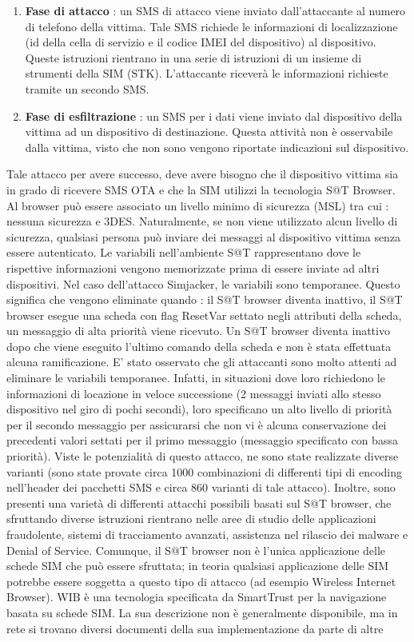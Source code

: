 \begin{enumerate}
\item \textbf{Fase di attacco} : un SMS di attacco viene inviato dall'attaccante al numero di telefono della vittima. Tale SMS richiede le informazioni di localizzazione (id della cella di servizio e il codice IMEI del dispositivo) al dispositivo. Queste istruzioni rientrano in una serie di istruzioni di un insieme di strumenti della SIM (STK). L'attaccante riceverà le informazioni richieste tramite un secondo SMS.
\item \textbf{Fase di esfiltrazione} : un SMS per i dati viene inviato dal dispositivo della vittima ad un dispositivo di destinazione. Questa attività non è osservabile dalla vittima, visto che non sono vengono riportate indicazioni sul dispositivo.
\end{enumerate}
Tale attacco per avere successo, deve avere bisogno che il dispositivo vittima sia in grado di ricevere SMS OTA e che la SIM utilizzi la tecnologia S@T Browser. Al browser può essere associato un livello minimo di sicurezza (MSL) tra cui : nessuna sicurezza e 3DES. Naturalmente, se non viene utilizzato alcun livello di sicurezza, qualsiasi persona può inviare dei messaggi al dispositivo vittima senza essere autenticato. Le variabili nell'ambiente S@T rappresentano dove le rispettive informazioni vengono memorizzate prima di essere inviate ad altri dispositivi. Nel caso dell'attacco Simjacker, le variabili sono temporanee. Questo significa che vengono eliminate quando : il S@T browser diventa inattivo, il S@T browser esegue una scheda con flag ResetVar settato negli attributi della scheda, un messaggio di alta priorità viene ricevuto. Un S@T browser diventa inattivo dopo che viene eseguito l'ultimo comando della scheda e non è stata effettuata alcuna ramificazione. E' stato osservato che gli attaccanti sono molto attenti ad eliminare le variabili temporanee. Infatti, in situazioni dove loro richiedono le informazioni di locazione in veloce successione (2 messaggi inviati allo stesso dispositivo nel giro di pochi secondi), loro specificano un alto livello di priorità per il secondo messaggio per assicurarsi che non vi è alcuna conservazione dei precedenti valori settati per il primo messaggio (messaggio specificato con bassa priorità). Viste le potenzialità di questo attacco, ne sono state realizzate diverse varianti (sono state provate circa 1000 combinazioni di differenti tipi di encoding nell'header dei pacchetti SMS e circa 860 varianti di tale attacco). Inoltre, sono presenti una varietà di differenti attacchi possibili basati sul S@T browser, che sfruttando diverse istruzioni rientrano nelle aree di studio delle applicazioni fraudolente, sistemi di tracciamento avanzati, assistenza nel rilascio dei malware e Denial of Service. Comunque, il S@T browser non è l'unica applicazione delle schede SIM che può essere sfruttata; in teoria qualsiasi applicazione delle SIM potrebbe essere soggetta a questo tipo di attacco (ad esempio Wireless Internet Browser). WIB è una tecnologia specificata da SmartTrust per la navigazione basata su schede SIM. La sua descrizione non è generalmente disponibile, ma in rete si trovano diversi documenti della sua implementazione da parte di altre 
